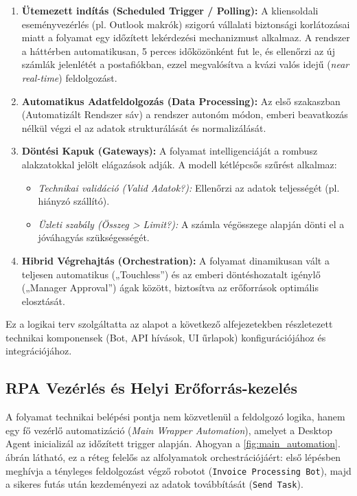 \begin{enumerate} 
    \item \textbf{Ütemezett indítás (Scheduled Trigger / Polling):} A kliensoldali eseményvezérlés (pl. Outlook makrók) szigorú vállalati biztonsági korlátozásai miatt a folyamat egy időzített lekérdezési mechanizmust alkalmaz. A rendszer a háttérben automatikusan, 5 perces időközönként fut le, és ellenőrzi az új számlák jelenlétét a postafiókban, ezzel megvalósítva a kvázi valós idejű (\textit{near real-time}) feldolgozást.
    
    \item \textbf{Automatikus Adatfeldolgozás (Data Processing):} Az első szakaszban (Automatizált Rendszer sáv) a rendszer autonóm módon, emberi beavatkozás nélkül végzi el az adatok strukturálását és normalizálását. 
    \item \textbf{Döntési Kapuk (Gateways):} A folyamat intelligenciáját a rombusz alakzatokkal jelölt elágazások adják. A modell kétlépcsős szűrést alkalmaz: 
        \begin{itemize} 
            \item \textit{Technikai validáció (Valid Adatok?):} Ellenőrzi az adatok teljességét (pl. hiányzó szállító). 
            \item \textit{Üzleti szabály (Összeg > Limit?):} A számla végösszege alapján dönti el a jóváhagyás szükségességét. 
        \end{itemize} 
    \item \textbf{Hibrid Végrehajtás (Orchestration):} A folyamat dinamikusan vált a teljesen automatikus („Touchless”) és az emberi döntéshozatalt igénylő („Manager Approval”) ágak között, biztosítva az erőforrások optimális elosztását. 
\end{enumerate}

Ez a logikai terv szolgáltatta az alapot a következő alfejezetekben részletezett technikai komponensek (Bot, API hívások, UI űrlapok) konfigurációjához és integrációjához.


\subsection{RPA Vezérlés és Helyi Erőforrás-kezelés}
\label{ssec:rpa_control_local}

A folyamat technikai belépési pontja nem közvetlenül a feldolgozó logika, hanem egy fő vezérlő automatizáció (\textit{Main Wrapper Automation}), amelyet a Desktop Agent inicializál az időzített trigger alapján. Ahogyan a \ref{fig:main_automation}. ábrán látható, ez a réteg felelős az alfolyamatok orchestrációjáért: első lépésben meghívja a tényleges feldolgozást végző robotot (\texttt{Invoice Processing Bot}), majd a sikeres futás után kezdeményezi az adatok továbbítását (\texttt{Send Task}).

